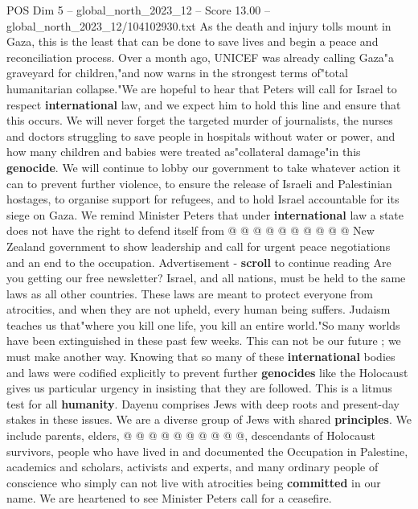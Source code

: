 \begin{textsample}{POS Dim 5 – global\_north\_2023\_12 – Score 13.00 – global\_north\_2023\_12/104102930.txt}  \label{ex:f5_pos_400}
As the death and injury tolls mount in Gaza, this is the least that can be done to save lives and begin a peace and reconciliation process.
Over a month ago, UNICEF was already calling Gaza"a graveyard for children,"and now warns in the strongest terms of"total humanitarian collapse."We are hopeful to hear that Peters will call for Israel to respect \textbf{international} law, and we expect him to hold this line and ensure that this occurs.
We will never forget the targeted murder of journalists, the nurses and doctors struggling to save people in hospitals without water or power, and how many children and babies were treated as"collateral damage"in this \textbf{genocide}.
We will continue to lobby our government to take whatever action it can to prevent further violence, to ensure the release of Israeli and Palestinian hostages, to organise support for refugees, and to hold Israel accountable for its siege on Gaza.
We remind Minister Peters that under \textbf{international} law a state does not have the right to defend itself from @ @ @ @ @ @ @ @ @ @ New Zealand government to show leadership and call for urgent peace negotiations and an end to the occupation.
Advertisement - \textbf{scroll} to continue reading Are you getting our free newsletter?
Israel, and all nations, must be held to the same laws as all other countries.
These laws are meant to protect everyone from atrocities, and when they are not upheld, every human being suffers.
Judaism teaches us that"where you kill one life, you kill an entire world."So many worlds have been extinguished in these past few weeks.
This can not be our future ; we must make another way.
Knowing that so many of these \textbf{international} bodies and laws were codified explicitly to prevent further \textbf{genocides} like the Holocaust gives us particular urgency in insisting that they are followed.
This is a litmus test for all \textbf{humanity}.
Dayenu comprises Jews with deep roots and present-day stakes in these issues.
We are a diverse group of Jews with shared \textbf{principles}.
We include parents, elders, @ @ @ @ @ @ @ @ @ @, descendants of Holocaust survivors, people who have lived in and documented the Occupation in Palestine, academics and scholars, activists and experts, and many ordinary people of conscience who simply can not live with atrocities being \textbf{committed} in our name.
We are heartened to see Minister Peters call for a ceasefire.

\end{textsample}
